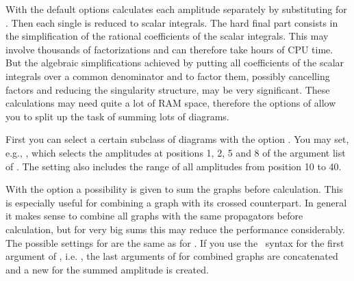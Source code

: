 
With the default options  calculates each amplitude 
separately by 
substituting  for . Then each single  is reduced 
to scalar integrals. The hard final part consists in the simplification of 
the rational coefficients of the scalar integrals. 
This may involve thousands of factorizations
and can therefore take hours of CPU time. But the algebraic simplifications achieved 
by putting all coefficients of the scalar integrals over a common denominator and 
to factor them, possibly cancelling factors and reducing the singularity 
structure, may be very significant.
These calculations may need quite a lot of RAM space, therefore the options
of  allow you to split up the task of summing lots of diagrams.

First you can select a certain subclass of diagrams with the option .
You may set, e.g., , which selects the 
amplitudes at positions 1, 2, 5 and 8 of the argument list of .
The setting  also includes the range of all amplitudes from position 10 to 40.

With the option  a possibility is given to sum the graphs before 
calculation. This is especially useful for combining a graph with its crossed counterpart.
In general it makes sense to combine all graphs with the same propagators before 
calculation, but for very big sums this may reduce the performance considerably.
The possible settings for  are the same as for .
If you use the \fa\ syntax for the first argument of ,   
i.e. , the last arguments of  for 
combined graphs are concatenated and a new  for the summed amplitude
is created.

